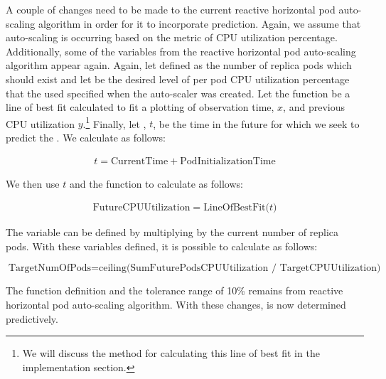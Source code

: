 A couple of changes need to be made to the current reactive horizontal pod
auto-scaling algorithm in order for it to incorporate prediction. Again, we
assume that auto-scaling is occurring based on the metric of
CPU utilization percentage. Additionally, some of the variables from the
reactive horizontal pod auto-scaling algorithm appear again. Again, let
 defined as the number of replica pods which should
exist and let  be the desired level of per pod CPU
utilization percentage that the used specified when the auto-scaler was created.
Let the function  be a line of best fit calculated
to fit a plotting of observation time, $x$, and previous CPU utilization
$y$.\footnote{We will discuss the method for calculating this line of best fit
in the implementation section.} Finally, let
, $t$, be the time in the future for
which we seek to predict the . We calculate
 as follows:

\begin{align*}
  t = \mbox{CurrentTime} + \mbox{PodInitializationTime}
\end{align*}

We then use $t$ and the  function to
calculate  as follows:

\begin{align*}
  \mbox{FutureCPUUtilization} = \mbox{LineOfBestFit($t$)}
\end{align*}

The variable  can be defined by multiplying
 by the current number of replica pods.
With these variables defined, it is possible to calculate
 as follows:

\[ \mbox{TargetNumOfPods} = \mbox{ceiling(SumFuturePodsCPUUtilization /
TargetCPUUtilization)} \]

The  function definition and the tolerance range of 10\% remains from
reactive horizontal pod auto-scaling algorithm. With these changes,
 is now determined predictively.
